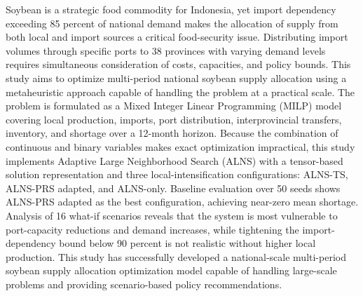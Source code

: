 \documentclass{file/TA-ITS}
\theoremstyle{definition}
\theoremstyle{definition}
\theoremstyle{plain}
\begin{document}
\begin{Abstract}
Soybean is a strategic food commodity for Indonesia, yet import dependency exceeding 85 percent of national demand makes the allocation of supply from both local and import sources a critical food-security issue. Distributing import volumes through specific ports to 38 provinces with varying demand levels requires simultaneous consideration of costs, capacities, and policy bounds. This study aims to optimize multi-period national soybean supply allocation using a metaheuristic approach capable of handling the problem at a practical scale. The problem is formulated as a Mixed Integer Linear Programming (MILP) model covering local production, imports, port distribution, interprovincial transfers, inventory, and shortage over a 12-month horizon. Because the combination of continuous and binary variables makes exact optimization impractical, this study implements Adaptive Large Neighborhood Search (ALNS) with a tensor-based solution representation and three local-intensification configurations: ALNS-TS, ALNS-PRS adapted, and ALNS-only. Baseline evaluation over 50 seeds shows ALNS-PRS adapted as the best configuration, achieving near-zero mean shortage. Analysis of 16 what-if scenarios reveals that the system is most vulnerable to port-capacity reductions and demand increases, while tightening the import-dependency bound below 90 percent is not realistic without higher local production. This study has successfully developed a national-scale multi-period soybean supply allocation optimization model capable of handling large-scale problems and providing scenario-based policy recommendations.
\end{Abstract}


\end{document}
